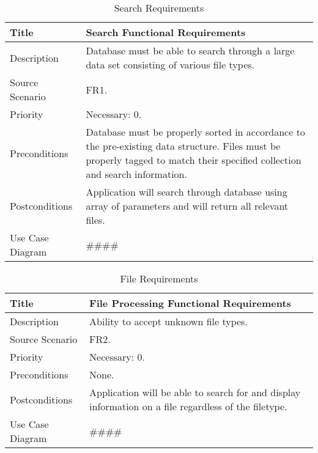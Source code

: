 \label{Search Requirements}
\begin{table}[h!]
  \caption{Search Requirements}
  \label{system-requirements/functional-requirements}
  \begin{tabularx}{\textwidth}{|l|X|}
    \hline
    Title            & Search Functional Requirements \\ \hline
    Description      & Database must be able to search through a large data set 
                       consisting of various file types. \\ \hline
    Source Scenario  & FR1. \\ \hline
    Priority         & Necessary: 0. \\ \hline
    Preconditions    & Database must be properly sorted in accordance to the 
                       pre-existing data structure. Files must be properly
                       tagged to match their specified collection and search
                       information. \\ \hline
    Postconditions   & Application will search through database using array of
                       parameters and will return all relevant files. \\ \hline
    Use Case Diagram & #### \\ \hline
  \end{tabularx}
\end{table}

\label{File Requirements}
\begin{table}[h!]
  \caption{File Requirements}
  \label{system-requirements/functional-requirements}
  \begin{tabularx}{\textwidth}{|l|X|}
    \hline
    Title            & File Processing Functional Requirements \\ \hline
    Description      & Ability to accept unknown file types. \\ \hline
    Source Scenario  & FR2. \\ \hline
    Priority         & Necessary: 0. \\ \hline
    Preconditions    & None. \\ \hline
    Postconditions   & Application will be able to search for and display
                       information on a file regardless of the filetype. \\ \hline
    Use Case Diagram & #### \\ \hline
  \end{tabularx}
\end{table}


